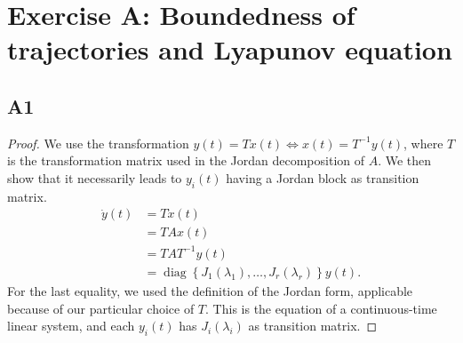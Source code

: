 \documentclass[11pt]{article}
\DeclareMathOperator{\diag}{diag}
\begin{document}
\section*{Exercise A: Boundedness of trajectories and Lyapunov equation}
\subsection*{A1}
\begin{proof}
We use the transformation \(y(t) = T x(t) \iff x(t) = T^{-1} y(t)\), where \(T\) is the transformation matrix used in the Jordan decomposition of \(A\).
We then show that it necessarily leads to \(y_i(t)\) having a Jordan block as transition matrix.
\begin{align*}
    \dot{y}(t) &= T \dot{x}(t) \\
    &= T A x(t) \\
    &= T A T^{-1} y(t) \\
    &= \diag\left\{J_1(\lambda_1), \dots, J_r(\lambda_r)\right\} y(t).
\end{align*}
For the last equality, we used the definition of the Jordan form, applicable because of our particular choice of \(T\).
This is the equation of a continuous-time linear system, and each \(y_i(t)\) has \(J_i(\lambda_i)\) as transition matrix.
\end{proof}
\end{document}
